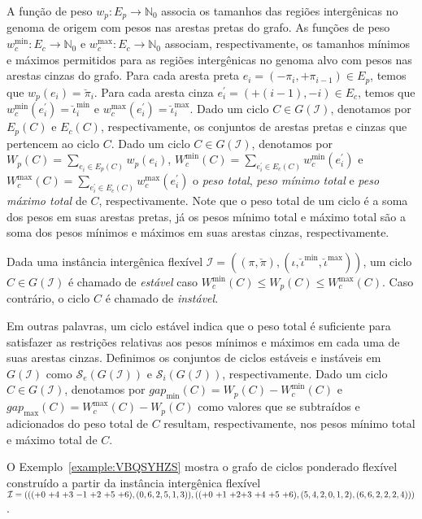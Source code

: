 A função de peso $w_p : E_p \rightarrow \mathbb{N}_0$ associa os tamanhos das regiões intergênicas no genoma de origem com pesos nas arestas pretas do grafo. As funções de peso $w^{\min}_c : E_c \rightarrow \mathbb{N}_0$ e $w^{\max}_c : E_c \rightarrow \mathbb{N}_0$ associam, respectivamente, os tamanhos mínimos e máximos permitidos para as regiões intergênicas no genoma alvo com pesos nas arestas cinzas do grafo. Para cada aresta preta $e_i = (-\pi_i, +\pi_{i-1}) \in E_p$, temos que $w_p(e_i) = \breve\pi_i$. Para cada aresta cinza $e^{\prime}_i = (+(i-1), -i) \in E_c$, temos que $w^{\min}_c(e^{\prime}_i) = \breve\iota^{\min}_i$ e $w^{\max}_c(e^{\prime}_i) = \breve\iota^{\max}_i$. Dado um ciclo $C \in G(\mathcal{I})$, denotamos por $E_p(C)$ e $E_c(C)$, respectivamente, os conjuntos de arestas pretas e cinzas que pertencem ao ciclo $C$. Dado um ciclo $C \in G(\mathcal{I})$, denotamos por $W_p(C)=\sum_{e_i \in E_p(C)} w_p(e_i)$, $W^{\min}_c(C)=\sum_{e^{\prime}_i \in E_c(C)} w^{\min}_c(e^{\prime}_i)$ e $W^{\max}_c(C)=\sum_{e^{\prime}_i \in E_c(C)} w^{\max}_c(e^{\prime}_i)$ o \emph{peso total}, \emph{peso mínimo total} e \emph{peso máximo total} de $C$, respectivamente. Note que o peso total de um ciclo é a soma dos pesos em suas arestas pretas, já os pesos mínimo total e máximo total são a soma dos pesos mínimos e máximos em suas arestas cinzas, respectivamente.

\begin{definition}
Dada uma instância intergênica flexível $\mathcal{I} = ((\pi,\breve\pi),(\iota,\breve\iota^{\min},\breve\iota^{\max}))$, um ciclo $C \in G(\mathcal{I})$ é chamado de \emph{estável} caso $W^{\min}_c(C) \le W_p(C) \le W^{\max}_c(C)$. Caso contrário, o ciclo $C$ é chamado de \emph{instável}.
\end{definition}

Em outras palavras, um ciclo estável indica que o peso total é suficiente para satisfazer as restrições relativas aos pesos mínimos e máximos em cada uma de suas arestas cinzas. Definimos os conjuntos de ciclos estáveis e instáveis em $G(\mathcal{I})$ como $\mathcal{S}_e(G(\mathcal{I}))$ e $\mathcal{S}_i(G(\mathcal{I}))$, respectivamente. Dado um ciclo $C \in G(\mathcal{I})$, denotamos por $gap_{\min}(C) = W_p(C) - W^{\min}_c(C)$ e $gap_{\max}(C) = W^{\max}_c(C) - W_p(C)$ como valores que se subtraídos e adicionados do peso total de $C$ resultam, respectivamente, nos pesos mínimo total e máximo total de $C$.

O Exemplo~\ref{example:VBQSYHZS} mostra o grafo de ciclos ponderado flexível construído a partir da instância intergênica flexível $\mathcal{I} = ((({+0}~{+4}~{+3}~{-1}~{+2}~{+5}~{+6}),(0,6,2,5,1,3)),(({+0}~{+1}~{+2}\break{+3}~{+4}~{+5}~{+6}),(5,4,2,0,1,2),(6,6,2,2,2,4)))$.


